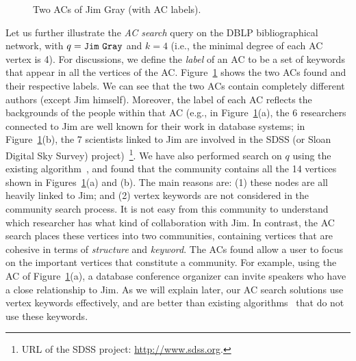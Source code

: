 \begin{figure}
{{            \label{fig:jim2}
        }
    }
    \caption{Two ACs of Jim Gray (with AC labels).}\label{fig:jim}
\end{figure}

Let us further illustrate the {\it AC search} query on the DBLP bibliographical network, with $q={\tt Jim~Gray}$ and $k=4$ (i.e., the minimal degree of each AC vertex is 4). For discussions, we define the {\it label} of an AC to be a set of keywords that appear in all the vertices of the AC.  Figure~\ref{fig:jim} shows the two ACs found and their respective labels.  We can see that the two ACs contain completely different authors (except Jim himself). Moreover, the label of each AC reflects the backgrounds of the people within that AC (e.g., in Figure~\ref{fig:jim}(a), the 6 researchers connected to Jim are well known for their work in database systems; in Figure~\ref{fig:jim}(b), the 7 scientists linked to Jim are involved in the SDSS (or Sloan Digital Sky Survey) project)~\footnote{URL of the SDSS project: \url{http://www.sdss.org}.}. We have also performed search on $q$ using the existing algorithm~\cite{KDD2010}, and found that the community contains all the 14 vertices shown in Figures~\ref{fig:jim}(a) and (b). The main reasons are: (1) these nodes are all heavily linked to Jim; and (2) vertex keywords are not considered in the community search process. It is not easy from this community to understand which researcher has what kind of collaboration with Jim. In contrast, the AC search places these vertices into two communities, containing vertices that are cohesive in terms of {\it structure} and {\it keyword}. The ACs found allow a user to focus on the important vertices that constitute a community. For example, using the AC of Figure~\ref{fig:jim}(a), a database conference organizer can invite speakers who have a close relationship to Jim. As we will explain later, our AC search solutions use vertex keywords effectively, and are better than existing algorithms~\cite{KDD2010,local2014} that do not use these keywords.

